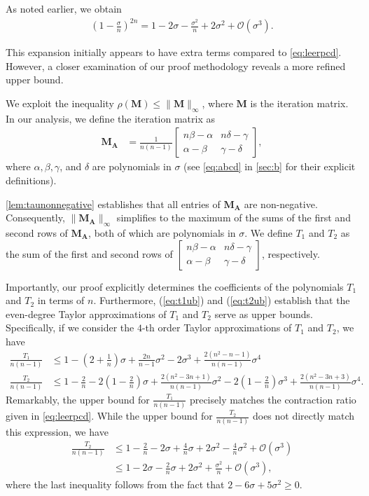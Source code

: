 \documentclass{article}
\theoremstyle{plain}
\theoremstyle{definition}
\theoremstyle{remark}
\def\bigopen#1{\left(#1\right)}
\def\mA{{\bm{A}}}
\def\mM{{\bm{M}}}
\def\gO{{\mathcal{O}}}
\begin{document}
As noted earlier, we obtain 
\begin{align*}
    \bigopen{{1 - \frac{\sigma}{n}}}^{2n} = 1 - 2 \sigma -\frac{\sigma^2}{n} + 2 \sigma^2 + \gO \bigopen{\sigma^3}.
\end{align*}

This expansion initially appears to have extra terms compared to \cref{eq:leerpcd}. However, a closer examination of our proof methodology reveals a more refined upper bound. 

We exploit the inequality $\rho(\mM) \le \|\mM\|_{\infty}$, where $\mM$ is the iteration matrix. In our analysis, we define the iteration matrix as
\begin{align*}
    \mM_{\mA} &= \frac{1}{n(n-1)}
    \begin{bmatrix}
        n\beta-\alpha & n\delta-\gamma \\
        \alpha-\beta & \gamma-\delta
    \end{bmatrix},
\end{align*}
where $\alpha, \beta, \gamma$, and $\delta$ are polynomials in $\sigma$ (see \eqref{eq:abcd} in \cref{sec:b} for their explicit definitions).

\cref{lem:taunonnegative} establishes that all entries of $\mM_{\mA}$ are non-negative. Consequently, $\|\mM_{\mA}\|_{\infty}$ simplifies to the maximum of the sums of the first and second rows of $\mM_{\mA}$, both of which are polynomials in $\sigma$. We define $T_1$ and $T_2$ as the sum of the first and second rows of $
\begin{bmatrix}
    n\beta-\alpha & n\delta-\gamma \\
    \alpha-\beta & \gamma-\delta
\end{bmatrix}$, respectively. 

Importantly, our proof explicitly determines the coefficients of the polynomials $T_1$ and $T_2$ in terms of $n$. Furthermore, (\ref{eq:t1ub}) and (\ref{eq:t2ub}) establish that the even-degree Taylor approximations of $T_1$ and $T_2$ serve as upper bounds. 
Specifically, if we consider the $4$-th order Taylor approximations of $T_1$ and $T_2$, we have
\begin{align*}
    \frac{T_1}{n(n-1)} &\le 1 - \bigopen{2+\frac{1}{n}}\sigma + \frac{2n}{n-1}\sigma^2 - 2\sigma^3 + \frac{2(n^2-n-1)}{n(n-1)}\sigma^4\\
    \frac{T_2}{n(n-1)} &\le 1-\frac{2}{n} - 2\bigopen{1-\frac{2}{n}}\sigma + \frac{2(n^2-3n+1)}{n(n-1)}\sigma^2 - 2\bigopen{1-\frac{2}{n}}\sigma^3 + \frac{2(n^2-3n+3)}{n(n-1)}\sigma^4.
\end{align*}
Remarkably, the upper bound for $\frac{T_{1}}{n(n-1)}$ precisely matches the contraction ratio given in \cref{eq:leerpcd}.
While the upper bound for $\frac{T_{2}}{n(n-1)}$ does not directly match this expression, we have 
\begin{align*}
    \frac{T_2}{n(n-1)} &\le 1-\frac{2}{n} - 2\sigma + \frac{4}{n}\sigma + 2\sigma^2 -  \frac{4}{n}\sigma^2 + \gO\bigopen{\sigma^3} \\
    &\le 1 - 2\sigma - \frac{2}{n}\sigma + 2\sigma^2 + \frac{\sigma^2}{n} + \gO\bigopen{\sigma^3},
\end{align*}
where the last inequality follows from the fact that $2-6\sigma+5\sigma^2\ge 0$.
\end{document}
